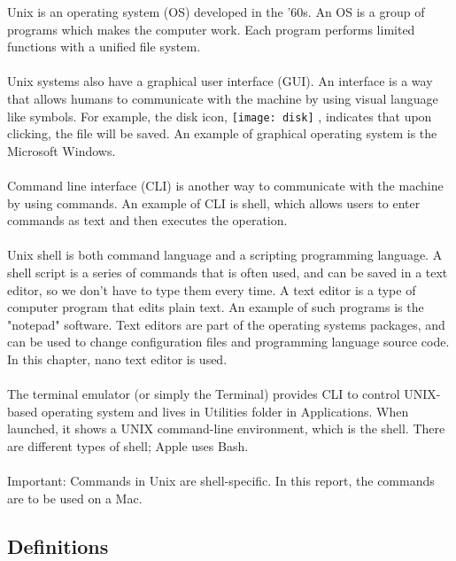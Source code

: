 \documentclass{article}
\begin{document}
Unix is an operating system (OS) developed in the '60s. An OS is a group of programs which makes the computer work. Each program performs limited functions with a unified file system.\\
\\
Unix systems also have a graphical user interface (GUI). An interface is a way that allows humans to communicate with the machine by using visual language like symbols. For example, the disk icon,  \texttt{[image: disk]} , indicates that upon clicking, the file will be saved. An example of graphical operating system is the Microsoft Windows.\\
\\
Command line interface (CLI) is another way to communicate with the machine by using commands. An example of CLI is shell, which allows users to enter commands as text and then executes the operation.\\
\\
Unix shell is both command language and a scripting programming language. A shell script is a series of commands that is often used, and can be saved in a text editor, so we don't have to type them every time. A text editor is a type of computer program that edits plain text. An example of such programs is the "notepad" software. Text editors are part of the operating systems packages, and can be used to change configuration files and programming language source code. In this chapter, nano text editor is used. \\
\\
The terminal emulator (or simply the Terminal) provides CLI to control UNIX-based operating system and lives in Utilities folder in Applications. When launched, it shows a UNIX command-line environment, which is the shell. There are different types of shell; Apple uses Bash. \\
\\
Important: Commands in Unix are shell-specific. In this report, the commands are to be used on a Mac. \\


\subsection{Definitions}
\end{document}
